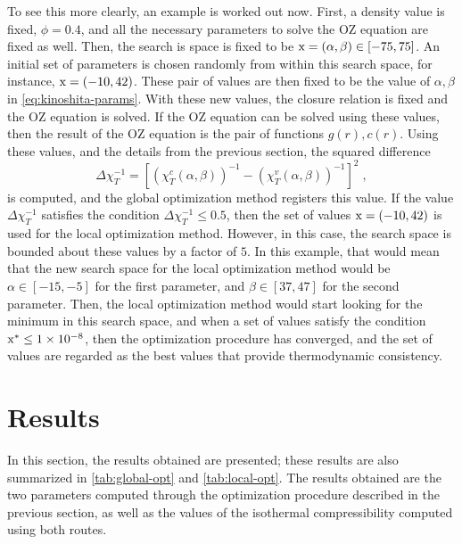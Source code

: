 To see this more clearly, an example is worked out now. First, a density value is fixed, 
\(\phi = 0.4\), and all the necessary parameters to solve the OZ equation are fixed as 
well. Then, the search is space is fixed to be \(\rm{x} = \left(\alpha, \beta\right) \in \left[-75, 75\right]\). 
An initial set of parameters is chosen randomly from within this search space, for 
instance, \(\rm{x} = \left(-10, 42\right)\). These pair of values are then fixed to be the 
value of \(\alpha, \beta\) in \autoref{eq:kinoshita-params}. With these new values, the 
closure relation is fixed and the OZ equation is solved. If the OZ equation can be solved 
using these values, then the result of the OZ equation is the pair of functions 
\(g(r), c(r)\). Using these values, and the details from the previous section, the squared 
difference 
\[
    \Delta \chi^{-1}_{T} = {\left[ {\left(\chi_{T}^{c} \left(\alpha, \beta\right) \right)}^{-1} - {\left(\chi_{T}^{v} \left(\alpha, \beta\right) \right)}^{-1} \right]}^2 
\; ,
\] 
is computed, and the global optimization method registers this value. If the value 
\(\Delta \chi^{-1}_{T}\) satisfies the condition \(\Delta \chi^{-1}_{T} \leq 0.5\), then 
the set of values \(\rm{x} = \left(-10, 42\right)\) is used for the local optimization 
method. However, in this case, the search space is bounded about these values by a factor 
of \(5\). In this example, that would mean that the new search space for the local 
optimization method would be \(\alpha \in [-15, -5]\) for the first parameter, and 
\(\beta \in [37, 47]\) for the second parameter. Then, the local optimization method would 
start looking for the minimum in this search space, and when a set of values satisfy the 
condition \(\rm{x}^{*} \leq \num{1e-8}\), then the optimization procedure has converged, 
and the set of values are regarded as the best values that provide thermodynamic 
consistency.

\section{Results}
In this section, the results obtained are presented; these results are also summarized in \autoref{tab:global-opt} and \autoref{tab:local-opt}. The results obtained are the two parameters computed through the optimization procedure described in the previous section, as well as the values of the isothermal compressibility computed using both routes.


